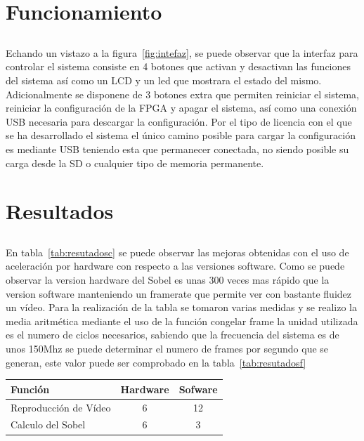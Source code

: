 \documentclass[a4paper,12pt,titlepage,final]{book}
\begin{document}
\section{Funcionamiento}
\subsection*{}
\subsubsection*{}
Echando un vistazo a la figura~\ref{fig:intefaz}, se puede observar que la interfaz para controlar el sistema consiste en 4 botones que activan y desactivan las funciones del sistema así como un LCD y un led que mostrara el estado del mismo. Adicionalmente se disponene de 3 botones extra que permiten reiniciar el sistema, reiniciar la configuración de la FPGA y apagar el sistema, así como una conexión USB necesaria para descargar la configuración. Por el tipo de licencia con el que se ha desarrollado el sistema el único camino posible para cargar la configuración es mediante USB teniendo esta que permanecer conectada, no siendo posible su carga desde la SD o cualquier tipo de memoria permanente.

\section{Resultados}
\subsection*{}
\subsubsection*{}
En tabla~\ref{tab:resutadosc} se puede observar las mejoras obtenidas con el uso de aceleración por hardware con respecto a las versiones software. Como se puede observar la version hardware del Sobel es unas 300 veces mas rápido que la version software manteniendo un framerate que permite ver con bastante fluidez un vídeo. Para la realización de la tabla se tomaron varias medidas y se realizo la media aritmética mediante el uso de la función congelar frame la unidad utilizada es el numero de ciclos necesarios, sabiendo que la frecuencia del sistema es de unos 150Mhz se puede determinar el numero de frames por segundo que se generan, este valor puede ser comprobado en la tabla~\ref{tab:resutadosf}

\begin{tabular}{l c c}
Función               & Hardware & Sofware \\
\hline
Reproducción de Vídeo & 6        & 12      \\
Calculo del Sobel     & 6        & 3       \\
\end{tabular}
\end{document}
